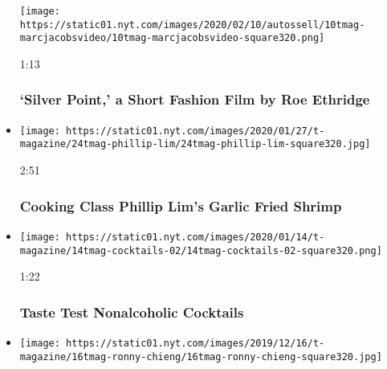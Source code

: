 \begin{itemize}
  \texttt{[image: https://static01.nyt.com/images/2020/02/10/autossell/10tmag-marcjacobsvideo/10tmag-marcjacobsvideo-square320.png]}

  1:13

  \hypertarget{silver-point-a-short-fashion-film-by-roe-ethridge}{%
  \subsubsection{`Silver Point,' a Short Fashion Film by Roe
  Ethridge}\label{silver-point-a-short-fashion-film-by-roe-ethridge}}
\item
  \href{https://www.nytimes.com/video/t-magazine/100000006938316/cooking-class-phillip-lims-garlic-fried-shrimp.html?action=click\&module=video-series-bar\&region=header\&pgtype=Article\&playlistId=video/t-magazine}{}

  \texttt{[image: https://static01.nyt.com/images/2020/01/27/t-magazine/24tmag-phillip-lim/24tmag-phillip-lim-square320.jpg]}

  2:51

  \hypertarget{cooking-class--phillip-lims-garlic-fried-shrimp}{%
  \subsubsection{Cooking Class \textbar{} Phillip Lim's Garlic Fried
  Shrimp}\label{cooking-class--phillip-lims-garlic-fried-shrimp}}
\item
  \href{https://www.nytimes.com/video/t-magazine/100000006913638/taste-test-nonalcoholic-cocktails.html?action=click\&module=video-series-bar\&region=header\&pgtype=Article\&playlistId=video/t-magazine}{}

  \texttt{[image: https://static01.nyt.com/images/2020/01/14/t-magazine/14tmag-cocktails-02/14tmag-cocktails-02-square320.png]}

  1:22

  \hypertarget{taste-test--nonalcoholic-cocktails}{%
  \subsubsection{Taste Test \textbar{} Nonalcoholic
  Cocktails}\label{taste-test--nonalcoholic-cocktails}}
\item
  \href{https://www.nytimes.com/video/t-magazine/100000006877761/tell-t-a-joke-ronny-chieng.html?action=click\&module=video-series-bar\&region=header\&pgtype=Article\&playlistId=video/t-magazine}{}

  \texttt{[image: https://static01.nyt.com/images/2019/12/16/t-magazine/16tmag-ronny-chieng/16tmag-ronny-chieng-square320.jpg]}


\end{itemize}

